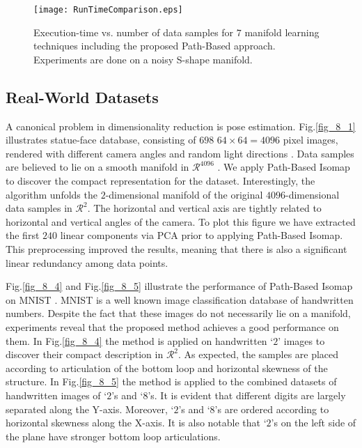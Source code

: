 \documentclass[10pt,journal,cspaper,compsoc]{IEEEtran}
\let\MYoriglatexcaption\caption
\renewcommand{\caption}[2][\relax]{\MYoriglatexcaption[#2]{#2}}
\begin{document}
\begin{figure}[t]
\centering
	\texttt{[image: RunTimeComparison.eps]}
	\caption{{\small Execution-time vs. number of data samples for $7$ manifold learning techniques including the proposed Path-Based approach. Experiments are done on a noisy S-shape manifold.}}
	\label{fig_runTime_comp}
\end{figure}

\subsection{Real-World Datasets}
A canonical problem in dimensionality reduction is pose estimation. Fig.\ref{fig_8_1} illustrates statue-face database, consisting of $698$ $64\times 64=4096$ pixel images, rendered with different camera angles and random light directions \cite{statueFace}.  
Data samples are believed to lie on a smooth manifold in $\mathcal{R}^{4096}$ \cite{tenenbaum2000global}. We apply Path-Based Isomap to discover the compact representation for the dataset. Interestingly, the algorithm unfolds the $2$-dimensional manifold of the original $4096$-dimensional data samples in $\mathcal{R}^2$. The horizontal and vertical axis are tightly related to horizontal and vertical angles of the camera. 
To plot this figure we have extracted the first $240$ linear components via PCA prior to applying Path-Based Isomap. This preprocessing improved the results, meaning that there is also a significant linear redundancy among data points. 

Fig.\ref{fig_8_4} and Fig.\ref{fig_8_5} illustrate the performance of Path-Based Isomap on MNIST \cite{MNIST}. MNIST is a well known image classification database of handwritten numbers. Despite the fact that these images do not necessarily lie on a manifold, experiments reveal that the proposed method achieves a good performance on them. In Fig.\ref{fig_8_4} the method is applied on handwritten `$2$' images to discover their compact description in $\mathcal{R}^2$. As expected, the samples are placed according to articulation of the bottom loop and horizontal skewness of the structure. In Fig.\ref{fig_8_5} the method is applied to the combined datasets of handwritten images of `$2$'s and `$8$'s. It is evident that different digits are largely separated along the Y-axis. Moreover, `$2$'s and `$8$'s are ordered according to horizontal skewness along the X-axis. It is also notable that `$2$'s on the left side of the plane have stronger bottom loop articulations.
\end{document}
